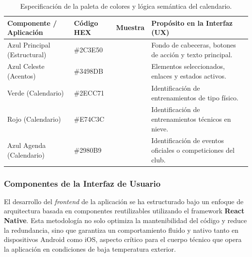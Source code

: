         \begin{table}[htbp]
        \centering
        \scriptsize
        \renewcommand{\arraystretch}{1.3}
        \setlength{\tabcolsep}{6pt}
        \begin{tabularx}{\textwidth}{|l|l|c|X|}
        \hline
        \rowcolor[HTML]{EFEFEF} 
        \textbf{Componente / Aplicación} & \textbf{Código HEX} & \textbf{Muestra} & \textbf{Propósito en la Interfaz (UX)} \\ \hline
        Azul Principal (Estructural) & \#2C3E50 & \colorbox[HTML]{2C3E50}{\hspace{0.4cm}} & Fondo de cabeceras, botones de acción y texto principal. \\ \hline
        Azul Celeste (Acentos) & \#3498DB & \colorbox[HTML]{3498DB}{\hspace{0.4cm}} & Elementos seleccionados, enlaces y estados activos. \\ \hline
        Verde (Calendario) & \#2ECC71 & \colorbox[HTML]{2ECC71}{\hspace{0.4cm}} & Identificación de entrenamientos de tipo físico. \\ \hline
        Rojo (Calendario) & \#E74C3C & \colorbox[HTML]{E74C3C}{\hspace{0.4cm}} & Identificación de entrenamientos técnicos en nieve. \\ \hline
        Azul Agenda (Calendario) & \#2980B9 & \colorbox[HTML]{2980B9}{\hspace{0.4cm}} & Identificación de eventos oficiales o competiciones del club. \\ \hline
        \end{tabularx}
        \caption{Especificación de la paleta de colores y lógica semántica del calendario.}
        \label{tab:paleta_colores}
        \end{table}

        \subsubsection{Componentes de la Interfaz de Usuario}

        El desarrollo del \textit{frontend} de la aplicación se ha estructurado bajo un enfoque de arquitectura basada en componentes reutilizables utilizando el framework \textbf{React Native}. Esta metodología no solo optimiza la mantenibilidad del código y reduce la redundancia, sino que garantiza un comportamiento fluido y nativo tanto en dispositivos Android como iOS, aspecto crítico para el cuerpo técnico que opera la aplicación en condiciones de baja temperatura exterior.

